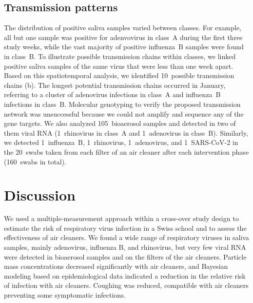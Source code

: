 \documentclass[fleqn,11pt]{wlscirep}
\begin{document}
\subsection*{Transmission patterns}

The distribution of positive saliva samples varied between classes. For example, all but one sample was positive for adenvovirus in class~A during the first three study weeks, while the vast majority of positive influenza~B samples were found in class~B. To illustrate possible transmission chains within classes, we linked positive saliva samples of the same virus that were less than one week apart. Based on this spatiotemporal analysis, we identified 10~possible transmission chains (b). The longest potential transmission chains occurred in January, referring to a cluster of adenovirus infections in class~A and influenza~B infections in class~B. Molecular genotyping to verify the proposed transmission network was unsuccessful because we could not amplify and sequence any of the gene targets. We also analyzed 105~bioaerosol samples and detected in two of them viral RNA (1~rhinovirus in class~A and 1~adenovirus in class~B). Similarly, we detected 1~influenza~B, 1~rhinovirus, 1~adenovirus, and 1~SARS-CoV-2 in the 20~swabs taken from each filter of an air cleaner after each intervention phase (160~swabs in total). 


\clearpage

\section*{Discussion}


We used a multiple-measurement approach within a cross-over study design to estimate the risk of respiratory virus infection in a Swiss school and to assess the effectiveness of air cleaners. We found a wide range of respiratory viruses in saliva samples, mainly adenovirus, influenza B, and rhinovirus, but very few viral RNA were detected in bioaerosol samples and on the filters of the air cleaners. Particle mass concentrations decreased significantly with air cleaners, and Bayesian modeling based on epidemiological data indicated a reduction in the relative risk of infection with air cleaners. Coughing was reduced, compatible with air cleaners preventing some symptomatic infections.
\end{document}

